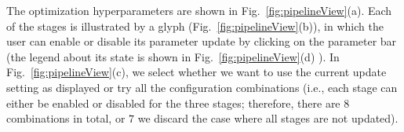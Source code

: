 The optimization hyperparameters are shown in Fig.~\ref{fig:pipelineView}(a). Each of the stages is illustrated by a glyph (Fig.~\ref{fig:pipelineView}(b)), in which the user can enable or disable its parameter update by clicking on the parameter bar (the legend about its state is shown in Fig.~\ref{fig:pipelineView}(d) ). In Fig.~\ref{fig:pipelineView}(c), we select whether we want to use the current update setting as displayed or try all the configuration combinations (i.e., each stage can either be enabled or disabled for the three stages; therefore, there are $8$ combinations in total, or $7$ we discard the case where all stages are not updated).




